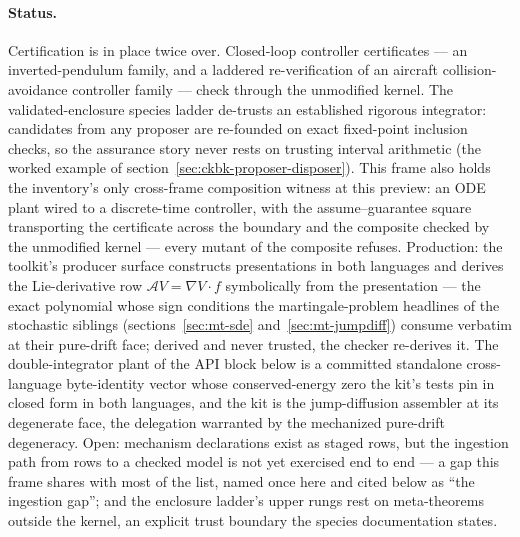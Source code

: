 \paragraph{Status.} Certification is in place twice over. Closed-loop
controller certificates --- an inverted-pendulum family, and a
laddered re-verification of an aircraft collision-avoidance
controller family --- check through the unmodified kernel. The
validated-enclosure species ladder de-trusts an established rigorous
integrator: candidates from any proposer are re-founded on exact
fixed-point inclusion checks, so the assurance story never rests on
trusting interval arithmetic (the worked example of
section~\ref{sec:ckbk-proposer-disposer}). This frame also holds the
inventory's only cross-frame composition witness at this preview: an
ODE plant wired to a discrete-time controller, with the
assume--guarantee square transporting the certificate across the
boundary and the composite checked by the unmodified kernel ---
every mutant of the composite refuses. Production: the toolkit's
producer surface constructs presentations in both languages and
derives the Lie-derivative row $\mathcal{A}V = \nabla V \cdot f$
symbolically from the presentation --- the exact polynomial whose
sign conditions the martingale-problem headlines of the stochastic
siblings (sections~\ref{sec:mt-sde} and~\ref{sec:mt-jumpdiff})
consume verbatim at their pure-drift face; derived and never
trusted, the checker re-derives it. The
double-integrator plant of the API block below is a committed
standalone cross-language byte-identity vector whose conserved-energy
zero the kit's tests pin in closed form in both languages, and the
kit is the jump-diffusion assembler at its degenerate face, the
delegation warranted by the mechanized pure-drift degeneracy. Open:
mechanism declarations exist as staged rows, but the ingestion path
from rows to a checked model is not yet exercised end to end --- a
gap this frame shares with most of the list, named once here and
cited below as ``the ingestion gap''; and the enclosure ladder's
upper rungs rest on meta-theorems outside the kernel, an explicit
trust boundary the species documentation states.



